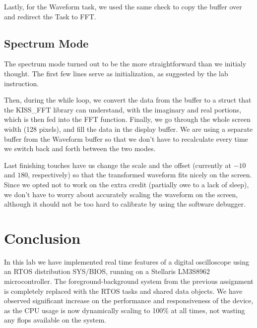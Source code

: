 \documentclass[12pt,oneside,letterpaper]{article}
\begin{document}


Lastly, for the Waveform task, we used the same check to copy the buffer over and redirect the Task to FFT. 


\subsection{Spectrum Mode}
The spectrum mode turned out to be the more straightforward than we initialy thought. The first few lines serve as initialization, as suggested by the lab instruction.

 

Then, during the while loop, we convert the data from the buffer to a struct that the KISS\_FFT library can understand, with the imaginary and real portions, which is then fed into the FFT function. Finally, we go through the whole screen width (128 pixels), and fill the data in the display buffer. We are using a separate buffer from the Waveform buffer so that we don't have to recalculate every time we switch back and forth between the two modes. 



Last finishing touches have us change the scale and the offset (currently at $-10$ and $180$, respectively) so that the transformed waveform fits nicely on the screen. Since we opted not to work on the extra credit (partially owe to a lack of sleep), we don't have to worry about accurately scaling the waveform on the screen, although it should not be too hard to calibrate by using the software debugger.

\section{Conclusion}
In this lab we have implemented real time features of a digital oscilloscope using an RTOS distribution SYS/BIOS, running on a Stellaris LM3S8962 microcontroller. The foreground-background system from the previous assignment is completely replaced with the RTOS tasks and shared data objects. We have observed significant increase on the performance and responsiveness of the device, as the CPU usage is now dynamically scaling to 100\% at all times, not wasting any flops available on the system.
\end{document}
